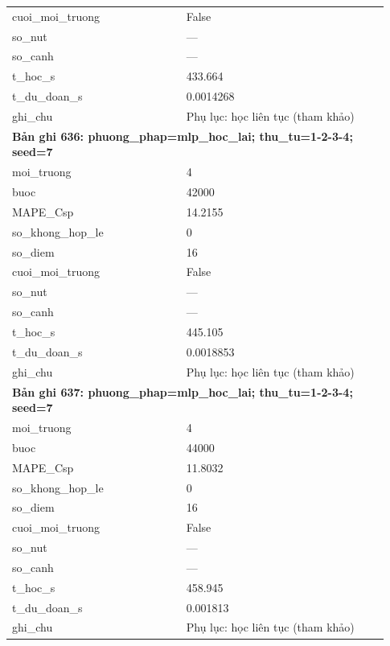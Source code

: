 \begin{longtable}{p{0.43\linewidth}p{0.50\linewidth}}
cuoi\_\allowbreak moi\_\allowbreak truong & False \\
so\_\allowbreak nut & — \\
so\_\allowbreak canh & — \\
t\_\allowbreak hoc\_\allowbreak s & 433.664 \\
t\_\allowbreak du\_\allowbreak doan\_\allowbreak s & 0.0014268 \\
ghi\_\allowbreak chu & Phụ lục: học liên tục (tham khảo) \\
\midrule
\multicolumn{2}{p{0.95\linewidth}}{\textbf{Bản ghi 636: phuong\_phap=mlp\_hoc\_lai; thu\_tu=1-2-3-4; seed=7}} \\
moi\_\allowbreak truong & 4 \\
buoc & 42000 \\
MAPE\_\allowbreak Csp & 14.2155 \\
so\_\allowbreak khong\_\allowbreak hop\_\allowbreak le & 0 \\
so\_\allowbreak diem & 16 \\
cuoi\_\allowbreak moi\_\allowbreak truong & False \\
so\_\allowbreak nut & — \\
so\_\allowbreak canh & — \\
t\_\allowbreak hoc\_\allowbreak s & 445.105 \\
t\_\allowbreak du\_\allowbreak doan\_\allowbreak s & 0.0018853 \\
ghi\_\allowbreak chu & Phụ lục: học liên tục (tham khảo) \\
\midrule
\multicolumn{2}{p{0.95\linewidth}}{\textbf{Bản ghi 637: phuong\_phap=mlp\_hoc\_lai; thu\_tu=1-2-3-4; seed=7}} \\
moi\_\allowbreak truong & 4 \\
buoc & 44000 \\
MAPE\_\allowbreak Csp & 11.8032 \\
so\_\allowbreak khong\_\allowbreak hop\_\allowbreak le & 0 \\
so\_\allowbreak diem & 16 \\
cuoi\_\allowbreak moi\_\allowbreak truong & False \\
so\_\allowbreak nut & — \\
so\_\allowbreak canh & — \\
t\_\allowbreak hoc\_\allowbreak s & 458.945 \\
t\_\allowbreak du\_\allowbreak doan\_\allowbreak s & 0.001813 \\
ghi\_\allowbreak chu & Phụ lục: học liên tục (tham khảo) \\

\end{longtable}
